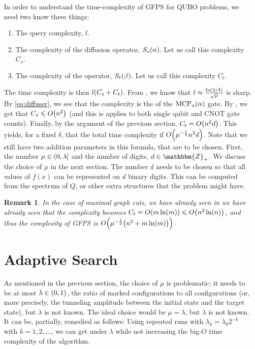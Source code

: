\documentclass[reqno,10pt]{amsart}
\numberwithin{equation}{section}                %
\let\originalleft\left
\let\originalright\right
\renewcommand{\left}{\mathopen{}\mathclose\bgroup\originalleft}
\renewcommand{\right}{\aftergroup\egroup\originalright}
\def\({\mathopen{}\left(}
\def\){\right)\mathclose{}}
\newtheorem{remark}[theorem]{Remark}
\def\Z{\mathbbm{Z}}
\begin{document}
In order to understand the time-complexity of GFPS for QUBO problems, we need two know three things:
\begin{enumerate}

   \item The query complexity, $l$.

   \item The complexity of the diffusion operator, $S_s \( \alpha \)$. Let us call this complexity $C_s$.

   \item The complexity of the operator, $S_t \( \beta \)$. Let us call this complexity $C_t$.

\end{enumerate}

The time complexity is then $l \( C_s + C_t \)$. From \cite{yoder_fixed_2014}, we know that $l \approx \tfrac{\ln \( 2 / \delta \)}{\sqrt{\mu}}$ is sharp. By \cref{eq:diffuser}, we see that the complexity is the of the $\mathrm{MCP}_n \( \alpha \)$ gate. By \cite{linear_dasilva_2022}, we get that $C_s \leqslant O \( n^2 \)$ (and this is applies to both single qubit and CNOT gate counts). Finally, by the argument of the previous section, $C_t = O \( n^2 d \)$. This yields, for a fixed $\delta$, that the total time complexity if $O \( \mu^{- \frac{1}{2}} n^2 d \)$. Note that we still have two addition parameters in this formula, that are to be chosen. First, the number $\mu \in \( 0, \lambda \right]$ and the number of digits, $d \in \Z_+$. We discuss the choice of $\mu$ in the next section. The number $d$ needs to be chosen so that all values of $f (x)$ can be represented on $d$ binary digits. This can be computed from the spectrum of $Q$, or other extra structures that the problem might have.

\begin{remark}
   In the case of maximal graph cuts, we have already seen in  we have already seen that the complexity becomes $C_t = O \( m \ln (m) \) \leqslant O \( n^2 \ln (n) \)$, and thus the complexity of GFPS is $O \( \mu^{- \frac{1}{2}} \( n^2 + m \ln(m) \) \)$.
\end{remark}

\bigskip

\section{Adaptive Search}
\label{sec:adaptive}

As mentioned in the previous section, the choice of $\mu$ is problematic; it needs to be at most $\lambda \in \( 0, 1 \)$, the ratio of marked configurations to all configurations (or, more precisely, the tunneling amplitude between the initial state and the target state), but $\lambda$ is not known. The ideal choice would be $\mu = \lambda$, but $\lambda$ is not known. It can be, partially, remedied as follows: Using repeated runs with $\lambda_k = \lambda_0 2^{- k}$ with $k = 1, 2, \ldots$, we can get under $\lambda$ while not increasing the big-$O$ time complexity of the algorithm.
\end{document}
